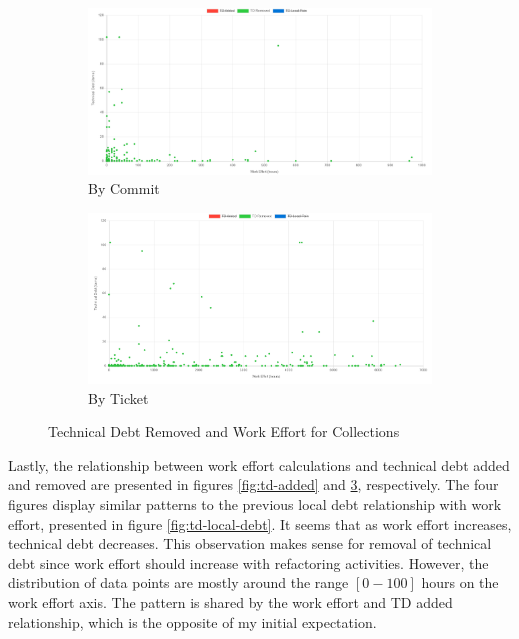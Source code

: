 \documentclass{mpaper}
\begin{document}
\begin{figure}
	\centering
	\begin{subfigure}{.45\textwidth}
		\includegraphics[width=\linewidth]{images/collections_removed_debt_commit.png}
		\caption{By Commit}
		\label{fig:td-removed-commit}
	\end{subfigure}
	\begin{subfigure}{.45\textwidth}
		\includegraphics[width=\linewidth]{images/collections_removed_debt_ticket.png}
		\caption{By Ticket}
		\label{fig:td-removed-ticket}
	\end{subfigure}
	\caption{Technical Debt Removed and Work Effort for Collections}
	\label{fig:td-removed}
\end{figure}

Lastly, the relationship between work effort calculations and technical debt
added and removed are presented in figures \ref{fig:td-added} and
\ref{fig:td-removed}, respectively. The four figures display similar patterns to
the previous local debt relationship with work effort, presented in figure
\ref{fig:td-local-debt}. It seems that as work effort increases, technical debt
decreases. This observation makes sense for removal of technical debt since work
effort should increase with refactoring activities. However, the distribution of
data points are mostly around the range $[0-100]$ hours on the work effort axis.
The pattern is shared by the work effort and TD added relationship, which is the
opposite of my initial expectation. 
\end{document}
